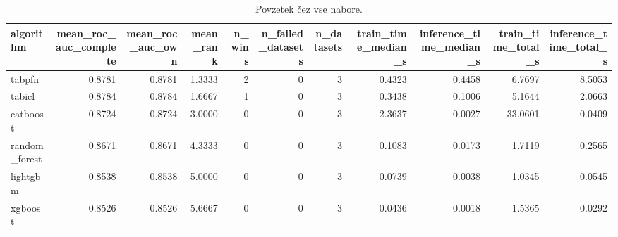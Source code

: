 \begin{table}[htbp]
\centering
\caption{Povzetek čez vse nabore.}
\label{tab:overall}
\begin{tabular}{lrrrrrrrrrr}
\hline
algorithm & mean\_roc\_auc\_complete & mean\_roc\_auc\_own & mean\_rank & n\_wins & n\_failed\_datasets & n\_datasets & train\_time\_median\_s & inference\_time\_median\_s & train\_time\_total\_s & inference\_time\_total\_s \\
\hline
tabpfn & 0.8781 & 0.8781 & 1.3333 & 2 & 0 & 3 & 0.4323 & 0.4458 & 6.7697 & 8.5053 \\
tabicl & 0.8784 & 0.8784 & 1.6667 & 1 & 0 & 3 & 0.3438 & 0.1006 & 5.1644 & 2.0663 \\
catboost & 0.8724 & 0.8724 & 3.0000 & 0 & 0 & 3 & 2.3637 & 0.0027 & 33.0601 & 0.0409 \\
random\_forest & 0.8671 & 0.8671 & 4.3333 & 0 & 0 & 3 & 0.1083 & 0.0173 & 1.7119 & 0.2565 \\
lightgbm & 0.8538 & 0.8538 & 5.0000 & 0 & 0 & 3 & 0.0739 & 0.0038 & 1.0345 & 0.0545 \\
xgboost & 0.8526 & 0.8526 & 5.6667 & 0 & 0 & 3 & 0.0436 & 0.0018 & 1.5365 & 0.0292 \\
\hline
\end{tabular}
\end{table}
